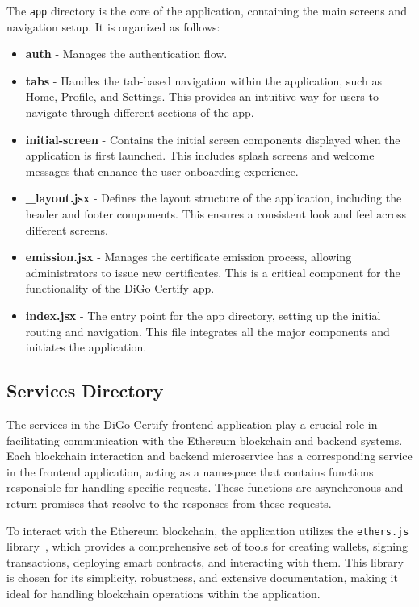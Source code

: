 The \texttt{app} directory is the core of the application, containing the main screens and navigation setup. It is organized as follows:

\begin{itemize}
    \item \textbf{auth} - Manages the authentication flow.
    \item \textbf{tabs} - Handles the tab-based navigation within the application, such as Home, Profile, and Settings. This provides an intuitive way for users to navigate through different sections of the app.
    \item \textbf{initial-screen} - Contains the initial screen components displayed when the application is first launched. This includes splash screens and welcome messages that enhance the user onboarding experience.
    \item \textbf{\_layout.jsx} - Defines the layout structure of the application, including the header and footer components. This ensures a consistent look and feel across different screens.
    \item \textbf{emission.jsx} - Manages the certificate emission process, allowing administrators to issue new certificates. This is a critical component for the functionality of the DiGo Certify app.
    \item \textbf{index.jsx} - The entry point for the app directory, setting up the initial routing and navigation. This file integrates all the major components and initiates the application.
\end{itemize}

\subsection{Services Directory}

The services in the DiGo Certify frontend application play a crucial role in facilitating communication with the Ethereum blockchain and backend systems. Each blockchain interaction and backend microservice has a corresponding service in the frontend application, acting as a namespace that contains functions responsible for handling specific requests. These functions are asynchronous and return promises that resolve to the responses from these requests.

To interact with the Ethereum blockchain, the application utilizes the \texttt{ethers.js} library~\cite{ethers}, which provides a comprehensive set of tools for creating wallets, signing transactions, deploying smart contracts, and interacting with them. This library is chosen for its simplicity, robustness, and extensive documentation, making it ideal for handling blockchain operations within the application.

